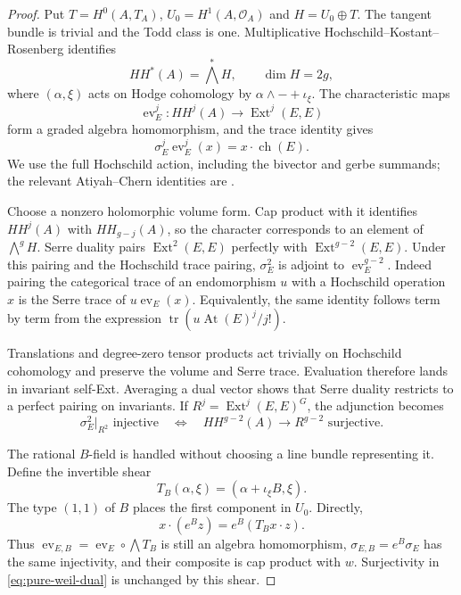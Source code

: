 \begin{proof}
Put $T=H^0(A,T_A)$, $U_0=H^1(A,\mathcal O_A)$ and $H=U_0\oplus T$. The tangent bundle is trivial and the Todd class is one. Multiplicative Hochschild--Kostant--Rosenberg identifies
\[
 HH^*(A)=\bigwedge^*H,\qquad \dim H=2g,
\]
where $(\alpha,\xi)$ acts on Hodge cohomology by $\alpha\wedge-+\iota_\xi$. The characteristic maps
\[
 \operatorname{ev}_E^j:HH^j(A)\longrightarrow\operatorname{Ext}^j(E,E)
\]
form a graded algebra homomorphism, and the trace identity gives
\begin{equation}\label{eq:pure-weil-trace}
 \sigma_E^j\operatorname{ev}_E^j(x)=x\cdot\operatorname{ch}(E).
\end{equation}
We use the full Hochschild action, including the bivector and gerbe summands; the relevant Atiyah--Chern identities are \cite[Proposition~6.2.1, Corollary~6.3.2 and Theorem~6.4.2]{BFHH}.

Choose a nonzero holomorphic volume form. Cap product with it identifies $HH^j(A)$ with $HH_{g-j}(A)$, so the character corresponds to an element of $\bigwedge^gH$. Serre duality pairs $\operatorname{Ext}^2(E,E)$ perfectly with $\operatorname{Ext}^{g-2}(E,E)$. Under this pairing and the Hochschild trace pairing, $\sigma_E^2$ is adjoint to $\operatorname{ev}_E^{g-2}$. Indeed pairing the categorical trace of an endomorphism $u$ with a Hochschild operation $x$ is the Serre trace of $u\operatorname{ev}_E(x)$. Equivalently, the same identity follows term by term from the expression $\operatorname{tr}(u\operatorname{At}(E)^j/j!)$.

Translations and degree-zero tensor products act trivially on Hochschild cohomology and preserve the volume and Serre trace. Evaluation therefore lands in invariant self-Ext. Averaging a dual vector shows that Serre duality restricts to a perfect pairing on invariants. If $R^j=\operatorname{Ext}^j(E,E)^G$, the adjunction becomes
\begin{equation}\label{eq:pure-weil-dual}
 \sigma_E^2|_{R^2}\text{ injective}
 \quad\Longleftrightarrow\quad
 HH^{g-2}(A)\longrightarrow R^{g-2}\text{ surjective}.
\end{equation}

The rational $B$-field is handled without choosing a line bundle representing it. Define the invertible shear
\[
 T_B(\alpha,\xi)=(\alpha+\iota_\xi B,\xi).
\]
The type $(1,1)$ of $B$ places the first component in $U_0$. Directly,
\[
 x\cdot(e^Bz)=e^B(T_Bx\cdot z).
\]
Thus $\operatorname{ev}_{E,B}=\operatorname{ev}_E\circ\bigwedge T_B$ is still an algebra homomorphism, $\sigma_{E,B}=e^B\sigma_E$ has the same injectivity, and their composite is cap product with $w$. Surjectivity in \eqref{eq:pure-weil-dual} is unchanged by this shear.


\end{proof}
